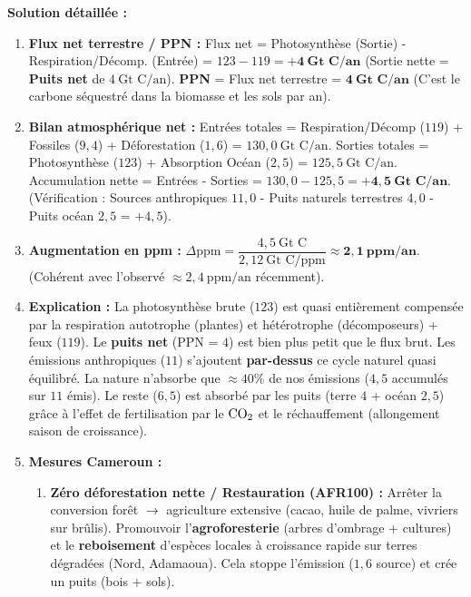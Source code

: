 \documentclass[11pt]{article}
\begin{document}
\begin{exoresolu}
\begin{enumerate}
    \end{enumerate}
    \tcblower
    \textbf{Solution détaillée :}
    \begin{enumerate}
        \item \textbf{Flux net terrestre / PPN :}
            Flux net = Photosynthèse (Sortie) - Respiration/Décomp. (Entrée) = $123 - 119 = \mathbf{+4\ \text{Gt C/an}}$ (Sortie nette = \textbf{Puits net} de $4\ \text{Gt C/an}$).
            \textbf{PPN} = Flux net terrestre = $\mathbf{4\ \text{Gt C/an}}$ (C'est le carbone séquestré dans la biomasse et les sols par an).
        \item \textbf{Bilan atmosphérique net :}
            Entrées totales = Respiration/Décomp ($119$) + Fossiles ($9,4$) + Déforestation ($1,6$) = $130,0\ \text{Gt C/an}$.
            Sorties totales = Photosynthèse ($123$) + Absorption Océan ($2,5$) = $125,5\ \text{Gt C/an}$.
            Accumulation nette = Entrées - Sorties = $130,0 - 125,5 = \mathbf{+4,5\ \text{Gt C/an}}$.
            (Vérification : Sources anthropiques $11,0$ - Puits naturels terrestres $4,0$ - Puits océan $2,5$ = $+4,5$).
        \item \textbf{Augmentation en ppm :}
            $\Delta \text{ppm} = \dfrac{4,5\ \text{Gt C}}{2,12\ \text{Gt C/ppm}} \approx \mathbf{2,1\ \text{ppm/an}}$.
            (Cohérent avec l'observé $\approx 2,4\ \text{ppm/an}$ récemment).
        \item \textbf{Explication :} La photosynthèse brute ($123$) est quasi entièrement compensée par la respiration autotrophe (plantes) et hétérotrophe (décomposeurs) + feux ($119$). Le \textbf{puits net} (PPN = $4$) est bien plus petit que le flux brut. Les émissions anthropiques ($11$) s'ajoutent \textbf{par-dessus} ce cycle naturel quasi équilibré. La nature n'absorbe que $\approx 40\%$ de nos émissions ($4,5$ accumulés sur $11$ émis). Le reste ($6,5$) est absorbé par les puits (terre $4$ + océan $2,5$) grâce à l'effet de fertilisation par le $\ce{CO2}$ et le réchauffement (allongement saison de croissance).
        \item \textbf{Mesures Cameroun :}
            \begin{enumerate}
                \item \textbf{Zéro déforestation nette / Restauration (AFR100) :} Arrêter la conversion forêt $\rightarrow$ agriculture extensive (cacao, huile de palme, vivriers sur brûlis). Promouvoir l'\textbf{agroforesterie} (arbres d'ombrage + cultures) et le \textbf{reboisement} d'espèces locales à croissance rapide sur terres dégradées (Nord, Adamaoua). Cela stoppe l'émission ($1,6$ source) et crée un puits (bois + sols).

\end{enumerate}
\end{enumerate}
\end{exoresolu}
\end{document}
